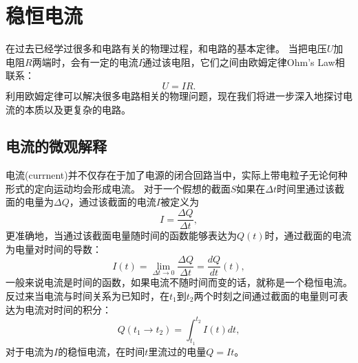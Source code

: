 
\chapter{稳恒电流}

在过去已经学过很多和电路有关的物理过程，和电路的基本定律。
当把电压$U$加电阻$R$两端时，会有一定的电流$I$通过该电阻，它们之间由{\heiti 欧姆定律}{Ohm's Law}相联系：
\begin{equation}\label{eqn: 欧姆定律}
U=IR.
\end{equation}
利用欧姆定律可以解决很多电路相关的物理问题，现在我们将进一步深入地探讨电流的本质以及更复杂的电路。

\section{电流的微观解释}
{\heiti 电流}(currnent)并不仅存在于加了电源的闭合回路当中，实际上带电粒子无论何种形式的定向运动均会形成电流。
对于一个假想的截面$S$如果在$\Delta t$时间里通过该截面的电量为$\Delta Q$，通过该截面的电流$I$被定义为
\begin{equation}
I=\frac{\Delta Q}{\Delta t},
\end{equation}
更准确地，当通过该截面电量随时间的函数能够表达为$Q(t)$时，通过截面的电流为电量对时间的导数：
\begin{equation}\label{eqn: 电流的导数定义}
I(t)=\lim_{\Delta t\rightarrow 0}\frac{\Delta Q}{\Delta t}=\frac{dQ}{dt}(t),
\end{equation}
一般来说电流是时间的函数，如果电流不随时间而变的话，就称是一个{\heiti 稳恒电流}。
反过来当电流与时间关系为已知时，在$t_1$到$t_2$两个时刻之间通过截面的电量则可表达为电流对时间的积分：
\begin{equation}
Q(t_1\rightarrow t_2)=\int_{t_1}^{t_2}I(t)dt,
\end{equation}
对于电流为$I$的稳恒电流，在时间$t$里流过的电量$Q=It$。

